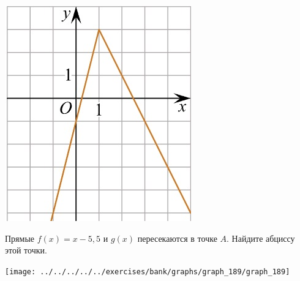 \begin{exam}
\begin{listofex}
\begin{minipage}[c]{0.11\textwidth}
				\includegraphics[align=t, width=\textwidth]{../../pics/G111M4C5-3.jpg}
			\end{minipage}
			\item \begin{minipage}[t]{0.43\textwidth}
				Прямые \( f(x)=x-5,5 \) и \( g(x) \) пересекаются в точке \( A \). Найдите абциссу этой точки.
			\end{minipage}
			\hspace{0.05\textwidth}
			\begin{minipage}[c]{0.11\textwidth}
				\texttt{[image: ../../../../../exercises/bank/graphs/graph\_189/graph\_189]}
			\end{minipage}
		\end{listofex}
	\end{exam}
